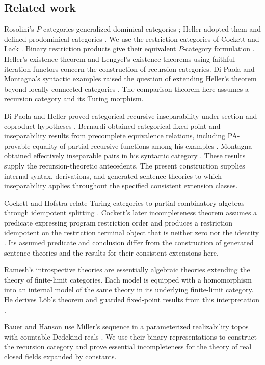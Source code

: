 \subsection{Related work}

Rosolini's $P$-categories generalized dominical categories
\cite{RosoliniThesis,Rosolini}; Heller adopted them and defined
prodominical categories \cite[Section~5]{Heller}.
We use the restriction categories of Cockett and Lack
\cite{CockettLack}. Binary restriction products give their equivalent
$P$-category formulation \cite[Proposition~4.5]{CockettLackIII}.
Heller's existence theorem \cite[Sections~8--9]{Heller} and
Lengyel's existence theorems using faithful iteration functors
\cite{Lengyel2004,Corrections} concern the construction of recursion
categories. Di Paola and Montagna's syntactic examples raised the
question of extending Heller's theorem beyond locally connected categories
\cite{DPM}. The comparison theorem here assumes a recursion category
and its Turing morphism.

Di Paola and Heller proved categorical recursive inseparability under
section and coproduct hypotheses
\cite[Theorem~8.15]{DPH}. Bernardi obtained categorical fixed-point
and inseparability results from precomplete equivalence relations,
including PA-provable equality of partial recursive functions among his
examples \cite[Section~3, pp.~125--128]{Bernardi}.
Montagna obtained effectively inseparable pairs in his syntactic
category \cite[Remark~3.1]{Montagna}. These results supply the
recursion-theoretic antecedents. The present construction supplies
internal syntax, derivations, and generated sentence theories to which
inseparability applies throughout the specified consistent extension
classes.

Cockett and Hofstra relate Turing categories to partial combinatory
algebras through idempotent splitting
\cite[Theorem~4.9]{CockettHofstra}. Cockett's later incompleteness
theorem assumes a predicate expressing program restriction order and
produces a restriction idempotent on the restriction terminal object
that is neither zero nor the identity
\cite[Section~7.5, Theorem~7.14]{CockettComputability}.
Its assumed predicate and conclusion differ from the construction of
generated sentence theories and the results for their consistent
extensions here.

Ramesh's introspective theories are essentially algebraic theories
extending the theory of finite-limit categories. Each model is equipped
with a homomorphism into an internal model of the same theory in its
underlying finite-limit category. He derives L\"ob's theorem and guarded
fixed-point results from this interpretation
\cite[Introduction, Definition~2.7, Theorem~4.19]{Ramesh2023}.

Bauer and Hanson use Miller's sequence in a parameterized realizability
topos with countable Dedekind reals \cite{BauerHanson}.
We use their binary representations to construct the recursion category
and prove essential incompleteness for the theory of real closed fields
expanded by constants.
